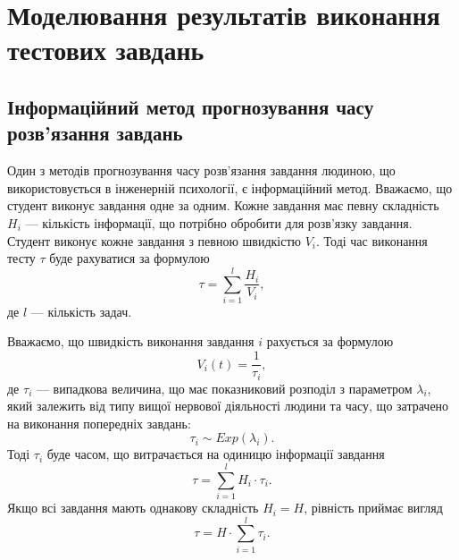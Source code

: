 \section{Моделювання результатів виконання тестових завдань}

\subsection{Інформаційний метод прогнозування часу розв’язання завдань}

Один з методів прогнозування часу розв’язання завдання людиною,
що використовується в інженерній психології, є інформаційний метод.
Вважаємо, що студент виконує завдання одне за одним.
Кожне завдання має певну складність $H_i$ --- кількість інформації,
що потрібно обробити для розв’язку завдання.
Студент виконує кожне завдання з певною швидкістю $V_i$.
Тоді час виконання тесту $\tau$ буде рахуватися за формулою
\begin{equation*}
  \tau = \sum_{i=1}^{l}\frac{H_i}{V_i},
\end{equation*}
де $l$ --- кількість задач. \cite{Lomov:1982}

Вважаємо, що швидкість виконання завдання $i$ рахується за формулою
\begin{equation*}
  V_i\left( t \right) = \frac{1}{\tau_i},
\end{equation*}
де $\tau_i$ --- випадкова величина, що має показниковий розподіл
з параметром $\lambda_i$, який залежить від типу вищої нервової діяльності
людини та часу, що затрачено на виконання попередніх завдань:
\begin{equation*}
  \tau_i \sim Exp\left( \lambda_i \right).
\end{equation*}
Тоді $\tau_i$ буде часом, що витрачається на одиницю інформації
завдання
\begin{equation*}
  \tau = \sum_{i=1}^{l} H_i \cdot \tau_i.
\end{equation*}
Якщо всі завдання мають однакову складність $H_i = H$, рівність приймає вигляд
\begin{equation*}
  \tau = H \cdot \sum_{i=1}^{l} \tau_i.
\end{equation*}

